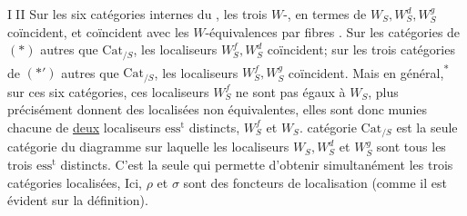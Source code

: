 \textcircled{III} Sur les six catégories internes du , les trois   $W$-, en termes de $W_S,W_S^d,W_S^g$ coïncident, et coïncident avec les $W$-équivalences par fibres . Sur les   catégories de $(*)$ autres que $\mathrm{Cat}_{/S}$, les localiseurs $W_S^f,W_S^d$ coïncident\textup{;} sur les trois catégories de $(*')$ autres que $\mathrm{Cat}_{/S}$, les localiseurs $W_S^f,W_S^g$ coïncident. Mais en général,\textsuperscript{*}
sur ces six catégories,  ces localiseurs $W_S^f$ ne sont pas égaux à $W_S$, plus précisément donnent des localisées non équivalentes,  elles sont donc munies chacune de \uline{deux} localiseurs $\mathrm{ess}^{\mathrm{t}}$ distincts, $W_S^f$ et $W_S$.  catégorie $\mathrm{Cat}_{/S}$ est la seule catégorie du diagramme sur laquelle les localiseurs $W_S,W_S^d$ et $W_S^g$ sont tous les trois $\mathrm{ess}^{\mathrm{t}}$ distincts. C'est la seule qui permette d'obtenir simultanément les trois catégories localisées, 
Ici, $\rho$ et $\sigma$ sont des foncteurs de localisation (comme il est évident sur la définition).

